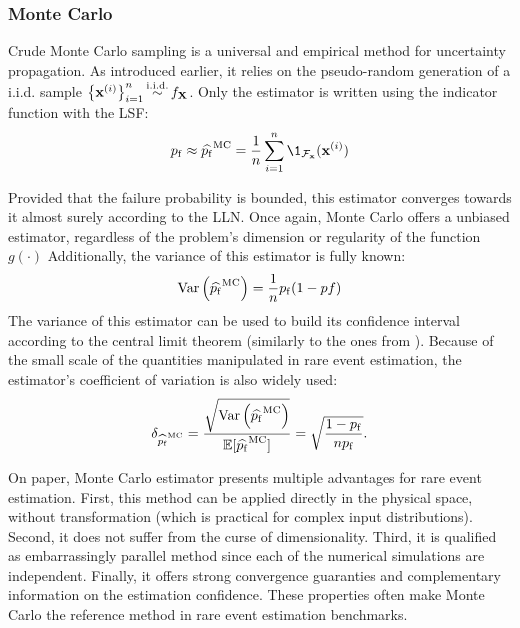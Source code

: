 \subsubsection{Monte Carlo}
Crude Monte Carlo sampling is a universal and empirical method for uncertainty propagation. 
As introduced earlier, it relies on the pseudo-random generation of a i.i.d. sample $\left\{{\bf x}^{(i)}\right\}_{i=1}^n \mathop{\sim}\limits^{\mathrm{i.i.d.}} f_{\bf X}$.   
Only the estimator is written using the indicator function with the LSF: 
\begin{equation}
    \pf \approx \what{\pf}^{\textrm{MC}} = \frac1n \sum_{i=1}^{n} \1_{\iF_\bx}(\bx^{(i)})
\end{equation} 

Provided that the failure probability is bounded, this estimator converges towards it almost surely according to the LLN. 
Once again, Monte Carlo offers a unbiased estimator, regardless of the problem's dimension or regularity of the function $g(\cdot)$  
Additionally, the variance of this estimator is fully known:
\begin{equation}
    \operatorname{Var}\left(\widehat{p_\mathrm{f}}^{\textrm{MC}}\right) = \frac1n p_\mathrm{f} (1 - pf)
\end{equation} 
The variance of this estimator can be used to build its confidence interval according to the central limit theorem (similarly to the ones from ). 
Because of the small scale of the quantities manipulated in rare event estimation, the estimator's coefficient of variation is also widely used: 
\begin{equation}
    \delta_{\widehat{p_\mathrm{f}}^{\textrm{MC}}} = \frac{\sqrt{\operatorname{Var}\left(\widehat{p_\mathrm{f}}^{\textrm{MC}}\right)}}{\mathbb{E}[\widehat{p_\mathrm{f}}^{\textrm{MC}}]}
                                      = \sqrt{\frac{1 - p_\mathrm{f}}{n p_\mathrm{f}}}.
\end{equation}

On paper, Monte Carlo estimator presents multiple advantages for rare event estimation.
First, this method can be applied directly in the physical space, without transformation (which is practical for complex input distributions).
Second, it does not suffer from the curse of dimensionality. 
Third, it is qualified as embarrassingly parallel method since each of the numerical simulations are independent.
Finally, it offers strong convergence guaranties and complementary information on the estimation confidence.
These properties often make Monte Carlo the reference method in rare event estimation benchmarks.


